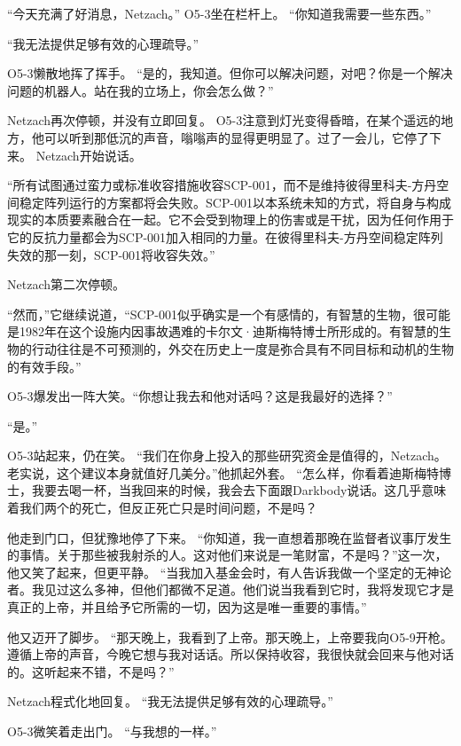“今天充满了好消息，Netzach。” O5-3坐在栏杆上。 “你知道我需要一些东西。”

“我无法提供足够有效的心理疏导。”

O5-3懒散地挥了挥手。 “是的，我知道。但你可以解决问题，对吧？你是一个解决问题的机器人。站在我的立场上，你会怎么做？”

Netzach再次停顿，并没有立即回复。 O5-3注意到灯光变得昏暗，在某个遥远的地方，他可以听到那低沉的声音，嗡嗡声的显得更明显了。过了一会儿，它停了下来。 Netzach开始说话。

“所有试图通过蛮力或标准收容措施收容SCP-001，而不是维持彼得里科夫-方丹空间稳定阵列运行的方案都将会失败。SCP-001以本系统未知的方式，将自身与构成现实的本质要素融合在一起。它不会受到物理上的伤害或是干扰，因为任何作用于它的反抗力量都会为SCP-001加入相同的力量。在彼得里科夫-方丹空间稳定阵列失效的那一刻，SCP-001将收容失效。”

Netzach第二次停顿。

“然而，”它继续说道，“SCP-001似乎确实是一个有感情的，有智慧的生物，很可能是1982年在这个设施内因事故遇难的卡尔文·迪斯梅特博士所形成的。有智慧的生物的行动往往是不可预测的，外交在历史上一度是弥合具有不同目标和动机的生物的有效手段。”

O5-3爆发出一阵大笑。“你想让我去和他对话吗？这是我最好的选择？”

“是。”

O5-3站起来，仍在笑。 “我们在你身上投入的那些研究资金是值得的，Netzach。老实说，这个建议本身就值好几美分。”他抓起外套。 
“怎么样，你看着迪斯梅特博士，我要去喝一杯，当我回来的时候，我会去下面跟Darkbody说话。这几乎意味着我们两个的死亡，但反正死亡只是时间问题，不是吗？

他走到门口，但犹豫地停了下来。 
“你知道，我一直想着那晚在监督者议事厅发生的事情。关于那些被我射杀的人。这对他们来说是一笔财富，不是吗？”这一次，他又笑了起来，但更平静。 
“当我加入基金会时，有人告诉我做一个坚定的无神论者。我见过这么多神，但他们都微不足道。他们说当我看到它时，我将发现它才是真正的上帝，并且给予它所需的一切，因为这是唯一重要的事情。”

他又迈开了脚步。 
“那天晚上，我看到了上帝。那天晚上，上帝要我向O5-9开枪。遵循上帝的声音，今晚它想与我对话话。所以保持收容，我很快就会回来与他对话的。这听起来不错，不是吗？”

Netzach程式化地回复。 “我无法提供足够有效的心理疏导。”

O5-3微笑着走出门。 “与我想的一样。”
